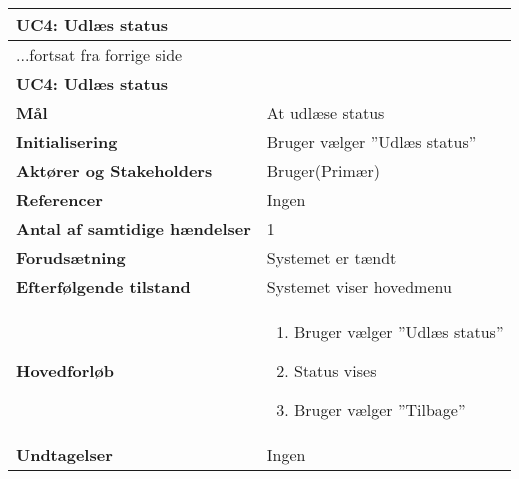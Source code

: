\begin{center} \centering
	\begin{longtable}{|p{6cm}|p{8cm}|}
	\hline
		\multicolumn{2}{|l|}{\textbf{UC4: Udlæs status}} \\\hline
		\endfirsthead
		
		\multicolumn{2}{l}{...fortsat fra forrige side} \\ \hline 
		\multicolumn{2}{|l|}{\textbf{UC4: Udlæs status}} \\\hline
		\endhead	
		
		\textbf{Mål}	&
			At udlæse status \\\hline
		\textbf{Initialisering} &
			Bruger vælger ''Udlæs status'' \\\hline
		\textbf{Aktører og Stakeholders} &
			Bruger(Primær) \\\hline
		\textbf{Referencer} &
			Ingen \\\hline
		\textbf{Antal af samtidige hændelser} &
			1 \\\hline
		\textbf{Forudsætning} &
			Systemet er tændt \\\hline
		\textbf{Efterfølgende tilstand} &
			Systemet viser hovedmenu \\\hline
		\textbf{Hovedforløb} &
		
		\begin{enumerate}
			\item Bruger vælger ''Udlæs status''
			\item Status vises
			\item Bruger vælger ''Tilbage''
		\end{enumerate} \\\hline
		
		\textbf{Undtagelser} &
			Ingen \\\hline
	\end{longtable}
	\label{UC4} 
\end{center}